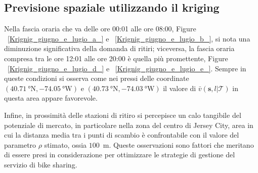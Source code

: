 \subsection{Previsione spaziale utilizzando il kriging}
Nella fascia oraria che va delle ore 00:01 alle ore 08:00, Figure ~\ref{Krignig_giugno_e_lugio_a_} e ~\ref{Krignig_giugno_e_lugio_b_}, si nota una diminuzione significativa della domanda di ritiri; viceversa, la fascia oraria compresa tra le ore 12:01 alle ore 20:00 è quella più promettente, Figure ~\ref{Krignig_giugno_e_lugio_d_} e ~\ref{Krignig_giugno_e_lugio_e_}. Sempre in queste condizioni si osserva come nei pressi delle coordinate $(\SI{40.71}{\degree} \text{N}, \SI{-74.05}{\degree} \text{W})$ e $(\SI{40.73}{\degree} \text{N}, \SI{-74.03}{\degree} \text{W})$ il valore di $\bar{v}(\mathbf{s}, l |\mathcal{T})$ in questa area appare favorevole.
\par Infine, in prossimità delle stazioni di ritiro si percepisce un calo tangibile del potenziale di mercato, in particolare nella zona del centro di Jersey City, area in cui la distanza media tra i punti di scambio è confrontabile con il valore del parametro $\rho$ stimato, ossia $100$~\unit{\meter}. Queste osservazioni sono fattori che meritano di essere presi in considerazione per ottimizzare le strategie di gestione del servizio di bike sharing.

